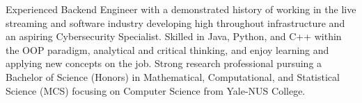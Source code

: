 

\begin{cvparagraph}

Experienced Backend Engineer with a demonstrated history of working in the live streaming and software industry developing high throughout infrastructure and an aspiring Cybersecurity Specialist. Skilled in Java, Python, and C++ within the OOP paradigm, analytical and critical thinking, and enjoy learning and applying new concepts on the job. Strong research professional pursuing a Bachelor of Science (Honors) in Mathematical, Computational, and Statistical Science (MCS) focusing on Computer Science from Yale-NUS College.
\end{cvparagraph}

